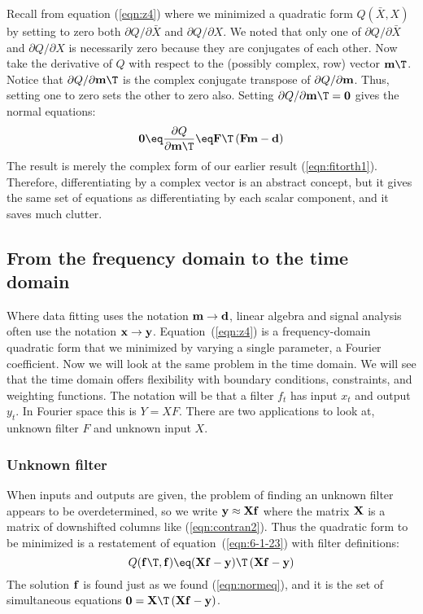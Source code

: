 Recall from equation (\ref{eqn:z4}) where
we minimized a quadratic form $Q(\bar X,X)$
by setting to zero both
$\partial Q/\partial \bar X$ and $\partial Q/\partial X$.
We noted that only one of
$\partial Q/\partial \bar X$ and $\partial Q/\partial X$
is necessarily zero
because they are conjugates of each other.
Now take the derivative of $Q$
with respect to the (possibly complex, row) vector $\bold m\T$.
Notice that $\partial Q/\partial  \bold m\T$ is the complex conjugate transpose
of $\partial Q/\partial  \bold m$.
Thus, setting one to zero sets the other to zero also.
Setting $\partial Q/\partial \bold m\T =\bold 0$ gives the normal equations:
\begin{equation}
\bold 0 \eq \frac{\partial Q}{\partial \bold m\T} \eq
\bold F\T\,(\bold F \bold m - \bold d)
\label{eqn:normeq}
\end{equation}
The result is merely the complex form of
our earlier result (\ref{eqn:fitorth1}).
Therefore,
differentiating by a complex vector
is an abstract concept,
but it gives the same set of equations
as differentiating by each scalar component,
and it saves much clutter.

\subsection{From the frequency domain to the time domain}
Where data fitting uses
the notation $\bold m \rightarrow \bold d$,
linear algebra and signal analysis often use
the notation $\bold x \rightarrow \bold y$.
Equation~(\ref{eqn:z4}) is a frequency-domain quadratic form
that we minimized by varying a single parameter,
a Fourier coefficient.
Now we will look at the same problem in the time domain.
We will see that the time domain offers flexibility with
boundary conditions, constraints, and weighting functions.
The notation will be that a filter $f_t$ has input $x_t$ and output $y_t$.
In Fourier space this is $Y=XF$.
There are two applications to look at,
unknown filter $F$ and unknown input $X$.

\subsubsection{Unknown filter}
When inputs and outputs are given,
the problem of finding an unknown filter appears to be overdetermined,
so we write $\bold y \approx \bold X \bold f$
where the matrix $\bold X$ is a matrix of downshifted columns like
(\ref{eqn:contran2}).
Thus the quadratic form to be minimized
is a restatement of equation~(\ref{eqn:6-1-23})
with filter definitions:
\begin{equation}
Q(\bold f\T, \bold f) \eq
(\bold X\bold f - \bold y)\T\,
(\bold X\bold f - \bold y)
\end{equation}
The solution $\bold f$ is found just as we found
(\ref{eqn:normeq}),
and it is the set of simultaneous equations
$ \bold 0 = \bold X\T\,(\bold X\bold f - \bold y)$.

